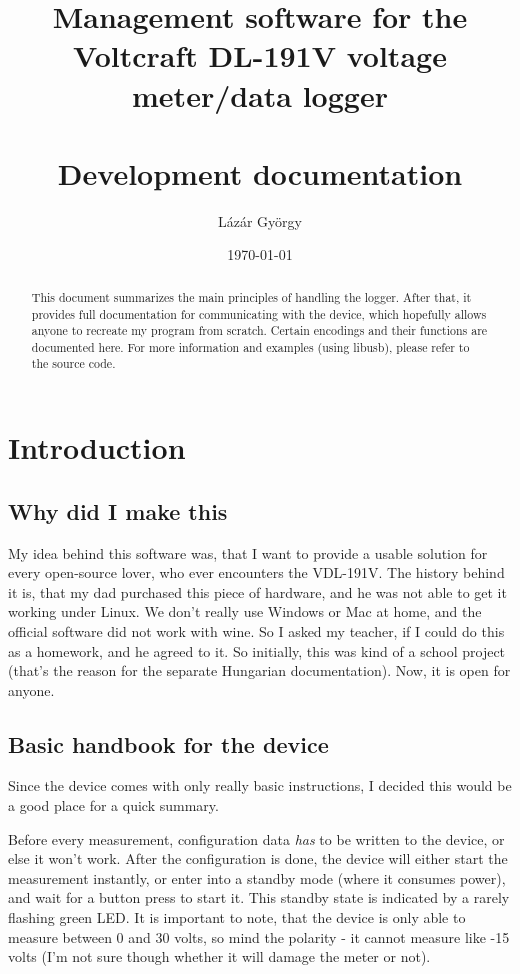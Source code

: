 \documentclass[a4paper,12pt]{article}
\title{\textbf{Management software for the Voltcraft DL-191V voltage meter/data logger} \\ \phantom{AS} \\
Development documentation}
\author{ Lázár György\\
}
\date{\today}
\begin{document}
\maketitle

\begin{abstract}
This document summarizes the main principles of handling the logger. After that, it provides full documentation for communicating with the device, which hopefully allows anyone to recreate my program from scratch. Certain encodings and their functions are documented here. For more information and examples (using libusb), please refer to the source code.
\end{abstract}

\section{Introduction}
\subsection{Why did I make this}
My idea behind this software was, that I want to provide a usable solution for every open-source lover, who ever encounters the VDL-191V. The history behind it is, that my dad purchased this piece of hardware, and he was not able to get it working under Linux. We don't really use Windows or Mac at home, and the official software did not work with wine. So I asked my teacher, if I could do this as a homework, and he agreed to it. So initially, this was kind of a school project (that's the reason for the separate Hungarian documentation). Now, it is open for anyone.

\subsection{Basic handbook for the device}
Since the device comes with only really basic instructions, I decided this would be a good place for a quick summary.

Before every measurement, configuration data \textit{has} to be written to the device, or else it won't work. After the configuration is done, the device will either start the measurement instantly, or enter into a standby mode (where it consumes power), and wait for a button press to start it. This standby state is indicated by a rarely flashing green LED. It is important to note, that the device is only able to measure between 0 and 30 volts, so mind the polarity - it cannot measure like -15 volts (I'm not sure though whether it will damage the meter or not). 
\end{document}
